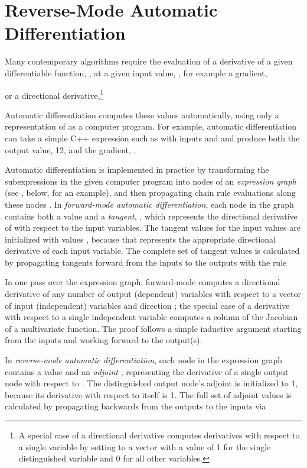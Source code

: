 \documentclass[12pt]{article}
\begin{document}
\section{Reverse-Mode Automatic Differentiation}

Many contemporary algorithms require the evaluation of a derivative
of a given differentiable function, , at a given input value, 
, for example a gradient,

or a directional derivative,\footnote{A special case of a directional derivative computes derivatives with
respect to a single variable by setting  to a vector with a
value of 1 for the single distinguished variable and 0 for all other
variables.}

Automatic differentiation computes these values automatically,
using only a representation of  as a computer program.  For example, 
automatic differentiation can take a simple C++ expression such as 
 with inputs  and  and 
produce both the output value, 12, and the gradient, .

Automatic differentiation is implemented in practice by transforming
the subexpressions in the given computer program into nodes of an
\textit{expression graph} (see , below,
for an example), and then propagating chain rule evaluations along
these nodes \citep{GriewankWalther:2008,Giles:2008}. In
\textit{forward-mode automatic differentiation}, each node  in the
graph contains both a value  and a \textit{tangent}, , which
represents the directional derivative of  with respect to the
input variables.  The tangent values for the input values are
initialized with values , because that represents the
appropriate directional derivative of each input variable.  The
complete set of tangent values is calculated by propagating tangents
forward from the inputs to the outputs with the rule

In one pass over the expression graph, forward-mode computes a
directional derivative of any number of output (dependent) variables
with respect to a vector of input (independent) variables and
direction ; the special case of a derivative with respect to
a single independent variable computes a column of the Jacobian of a
multivariate function.  The proof follows a simple inductive argument
starting from the inputs and working forward to the output(s).

In \textit{reverse-mode automatic differentiation}, each node  in
the expression graph contains a value  and an \textit{adjoint}
, representing the derivative of a single output node with
respect to .  The distinguished output node's adjoint is
initialized to 1, because its derivative with respect to itself is 1.
The full set of adjoint values is calculated by propagating backwards
from the outputs to the inputs via
\end{document}
